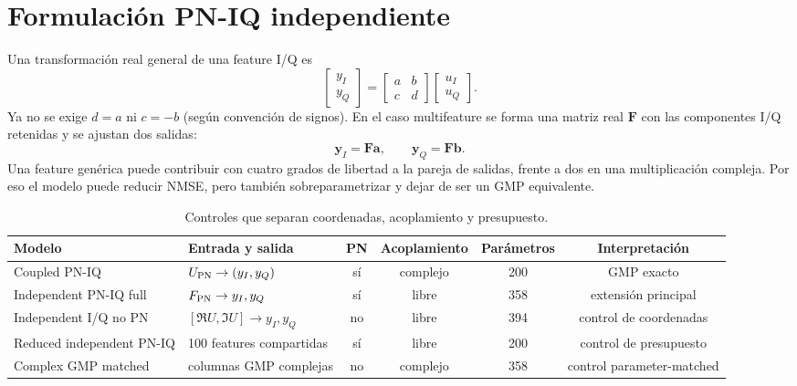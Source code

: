 \documentclass[10pt,a4paper]{article}
\begin{document}
\section{Formulación PN-IQ independiente}

Una transformación real general de una feature I/Q es
\begin{equation}
 \begin{bmatrix}y_I\\y_Q\end{bmatrix}
 =\begin{bmatrix}a&b\\c&d\end{bmatrix}
 \begin{bmatrix}u_I\\u_Q\end{bmatrix}.
 \label{eq:independent2x2}
\end{equation}
Ya no se exige $d=a$ ni $c=-b$ (según convención de signos). En el caso
multifeature se forma una matriz real $\mathbf F$ con las componentes I/Q
retenidas y se ajustan dos salidas:
\begin{equation}
 \mathbf y_I=\mathbf F\mathbf a,\qquad
 \mathbf y_Q=\mathbf F\mathbf b.
\end{equation}
Una feature genérica puede contribuir con cuatro grados de libertad a la pareja
de salidas, frente a dos en una multiplicación compleja. Por eso el modelo puede
reducir NMSE, pero también sobreparametrizar y dejar de ser un GMP equivalente.

\begin{table}[ht]
\centering\small
\caption{Controles que separan coordenadas, acoplamiento y presupuesto.}
\begin{tabularx}{\linewidth}{@{}lXcccc@{}}
\toprule
Modelo & Entrada y salida & PN & Acoplamiento & Parámetros & Interpretación\\
\midrule
Coupled PN-IQ & $U_{\rm PN}\to(y_I,y_Q)$ & sí & complejo & 200 & GMP exacto\\
Independent PN-IQ full & $F_{\rm PN}\to y_I,y_Q$ & sí & libre & 358 & extensión principal\\
Independent I/Q no PN & $[\Re U,\Im U]\to y_I,y_Q$ & no & libre & 394 & control de coordenadas\\
Reduced independent PN-IQ & 100 features compartidas & sí & libre & 200 & control de presupuesto\\
Complex GMP matched & columnas GMP complejas & no & complejo & 358 & control parameter-matched\\
\bottomrule
\end{tabularx}
\end{table}
\end{document}
